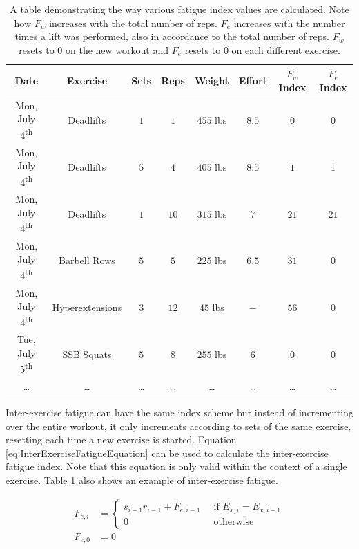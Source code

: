\begin{table}[h]
	\centering
	\begin{tabular}{c|c|c|c|c|c|c|c}
		Date & Exercise & Sets & Reps & Weight & Effort & $F_w$ Index & $F_e$ Index \\
        \hline
        Mon, July 4\textsuperscript{th} & Deadlifts & $1$ & $1$ & $455$ lbs & $8.5$ & $0$ & $0$ \\
        Mon, July 4\textsuperscript{th} & Deadlifts & $5$ & $4$ & $405$ lbs & $8.5$ & $1$ & $1$ \\
        Mon, July 4\textsuperscript{th} & Deadlifts & $1$ & $10$ & $315$ lbs & $7$ & $21$ & $21$ \\
        Mon, July 4\textsuperscript{th} & Barbell Rows & $5$ & $5$ & $225$ lbs & $6.5$ & $31$ & $0$ \\
        Mon, July 4\textsuperscript{th} & Hyperextensions & $3$ & $12$ & $45$ lbs & $-$ & $56$ & $0$ \\
        Tue, July 5\textsuperscript{th} & SSB Squats & $5$ & $8$ & $255$ lbs & $6$ & $0$ & $0$ \\
        \dots & \dots & \dots & \dots & \dots & \dots & \dots & \dots \\
	\end{tabular}
	\caption{A table demonstrating the way various fatigue index values are calculated. Note how $F_w$ increases with the total number of reps. $F_e$ increases with the number times a lift was performed, also in accordance to the total number of reps. $F_w$ resets to $0$ on the new workout and $F_e$ resets to $0$ on each different exercise.}
	\label{tab:IndexesExample}
\end{table}

Inter-exercise fatigue can have the same index scheme but instead of incrementing over the entire workout, it only increments according to sets of the same exercise, resetting each time a new exercise is started. Equation \ref{eq:InterExerciseFatigueEquation} can be used to calculate the inter-exercise fatigue index. Note that this equation is only valid within the context of a single exercise. Table \ref{tab:IndexesExample} also shows an example of inter-exercise fatigue.

\begin{equation}
	\label{eq:InterExerciseFatigueEquation}
	\begin{split}
		F_{e,i} & =
		\begin{cases}
			s_{i-1}r_{i-1}+F_{e,i-1} \;\; & \text{if }E_{x,i}=E_{x,i-1} \\
			0 \;\; & \text{otherwise}
		\end{cases}
		\\
		F_{e,0} & = 0
	\end{split}
\end{equation}

